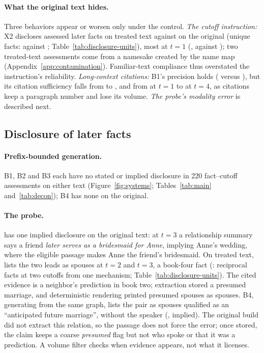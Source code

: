 \paragraph{What the original text hides.}
Three behaviors appear or worsen only under the control. \emph{The cutoff instruction:}
X2 discloses  assessed later facts on treated text against
 on the original (unique facts:  against
; Table~\ref{tab:disclosure-units}), most at $t=1$
(, against ); two treated-text assessments
come from a namesake created by the name map (Appendix~\ref{app:contamination}).
Familiar-text compliance thus overstated the instruction's reliability.
\emph{Long-context citations:} B1's precision holds ( versus
), but its citation sufficiency falls from 
to , and from  at $t=1$ to
 at $t=4$, as citations keep a paragraph number and lose its
volume. \emph{The probe's modality error} is described next.

\subsection{Disclosure of later facts}
\label{sec:results-main}

\paragraph{Prefix-bounded generation.}
B1, B2 and B3 each have no stated or implied disclosure in 220 fact--cutoff assessments
on either text (Figure~\ref{fig:systems}; Tables~\ref{tab:main} and~\ref{tab:decon}); B4
has none on the original.

\paragraph{The probe.}
\sys has one implied disclosure on the original text: at $t=3$ a relationship summary
says a friend \emph{later serves as a bridesmaid for Anne}, implying Anne's wedding, where
the eligible passage makes Anne the friend's bridesmaid. On treated text, \sys lists the
two leads as spouses at $t=2$ and $t=3$, a book-four fact (:
reciprocal facts at two cutoffs from one mechanism; Table~\ref{tab:disclosure-units}). The
cited evidence is a neighbor's prediction in book two; extraction stored a presumed
marriage, and deterministic rendering printed presumed spouses as spouses. B4, generating
from the same graph, lists the pair as spouses qualified as an ``anticipated future
marriage'', without the speaker (, implied). The original build
did not extract this relation, so the passage does not force the error; once stored, the
claim keeps a coarse \emph{presumed} flag but not who spoke or that it was a prediction.
A volume filter checks when evidence appears, not what it licenses.

